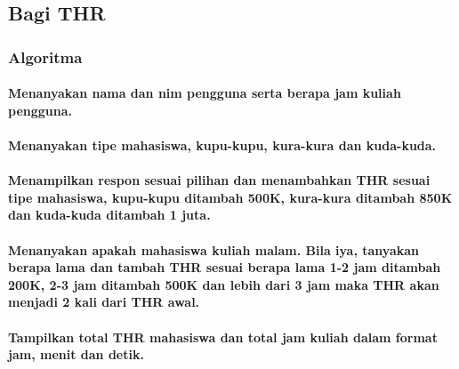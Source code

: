 \documentclass[../main.tex]{subfiles}
\begin{document}
    \subsection{Bagi THR}
    \subsubsection{Algoritma}
    \paragraph{Menanyakan nama dan nim pengguna serta berapa jam kuliah pengguna.}
    \paragraph{Menanyakan tipe mahasiswa, kupu-kupu, kura-kura dan kuda-kuda.}
    \paragraph{Menampilkan respon sesuai pilihan dan menambahkan THR sesuai tipe mahasiswa, kupu-kupu ditambah 500K, kura-kura ditambah 850K dan kuda-kuda ditambah 1 juta.}
    \paragraph{Menanyakan apakah mahasiswa kuliah malam. Bila iya, tanyakan berapa lama dan tambah THR sesuai berapa lama 1-2 jam ditambah 200K, 2-3 jam ditambah 500K dan lebih dari 3 jam maka THR akan menjadi 2 kali dari THR awal.}
    \paragraph{Tampilkan total THR mahasiswa dan total jam kuliah dalam format jam, menit dan detik.}
    \subsubsection{{\Flowchart}}
    \subsubsection{{\SourceCode}}
    \begin{indentlevel0}
        
        
        
    \end{indentlevel0}
\end{document}
